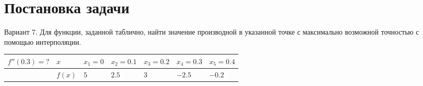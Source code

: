 \documentclass[../main.tex]{subfiles}
\begin{document}
\section{Постановка задачи}

Вариант 7. Для функции, заданной таблично, найти значение производной в указанной точке с максимально возможной точностью с помощью интерполяции.


\begin{table}[h]
    \centering
    \begin{tabular}{|l|l|l|l|l|l|l|}
    \hline
    $f''(0.3)=?$ & $x$ & $x_1 = 0$ & $x_2 = 0.1$ & $x_3 = 0.2$  & $x_4 = 0.3$ & $x_5 = 0.4$  \\ \hline
    & $f(x)$ & $5$ & $2.5$ & $3$ & $-2.5$ & $-0.2$ \\ \hline
    \end{tabular}
\end{table}
\end{document}
